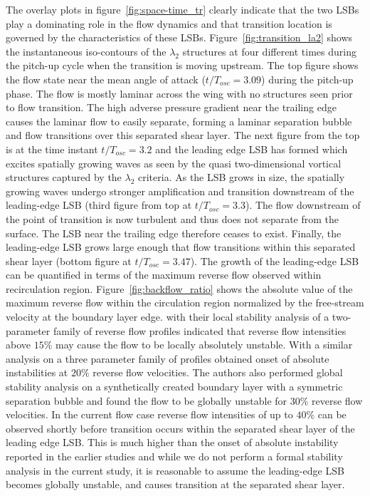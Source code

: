 The overlay plots in figure~\ref{fig:space-time_tr} clearly indicate that the two LSBs play a dominating role in the flow dynamics and that transition location is governed by the characteristics of these LSBs. Figure~\ref{fig:transition_la2} shows the instantaneous iso-contours of the $\lambda_{2}$ structures at four different times during the pitch-up cycle when the transition is moving upstream. The top figure shows the flow state near the mean angle of attack ($t/T_{osc}=3.09$) during the pitch-up phase. The flow is mostly laminar across the wing with no structures seen prior to flow transition. The high adverse pressure gradient near the trailing edge causes the laminar flow to easily separate, forming a laminar separation bubble and flow transitions over this separated shear layer. The next figure from the top is at the time instant $t/T_{osc}=3.2$ and the leading edge LSB has formed which excites spatially growing waves as seen by the quasi two-dimensional vortical structures captured by the $\lambda_{2}$ criteria. As the LSB grows in size, the spatially growing waves undergo stronger amplification and transition downstream of the leading-edge LSB (third figure from top at $t/T_{osc}=3.3$). The flow downstream of the point of transition is now turbulent and thus does not separate from the surface. The LSB near the trailing edge therefore ceases to exist. Finally, the leading-edge LSB grows large enough that flow transitions within this separated shear layer (bottom figure at $t/T_{osc}=3.47$). The growth of the leading-edge LSB can be quantified in terms of the maximum reverse flow observed within recirculation region. Figure~\ref{fig:backflow_ratio} shows the absolute value of the maximum reverse flow within the circulation region normalized by the free-stream velocity at the boundary layer edge. \cite{alam00} with their local stability analysis of a two-parameter family of reverse flow profiles indicated that reverse flow intensities above $15\%$ may cause the flow to be locally absolutely unstable. With a similar analysis on a three parameter family of profiles \cite{hammond98} obtained onset of absolute instabilities at $20\%$ reverse flow velocities. The authors also performed global stability analysis on a synthetically created boundary layer with a symmetric separation bubble \citep{hammond98} and found the flow to be globally unstable for $30\%$ reverse flow velocities. In the current flow case reverse flow intensities of up to $40\%$ can be observed shortly before transition occurs within the separated shear layer of the leading edge LSB. This is much higher than the onset of absolute instability reported in the earlier studies and while we do not perform a formal stability analysis in the current study, it is reasonable to assume the leading-edge LSB becomes globally unstable, and causes transition at the separated shear layer. 

